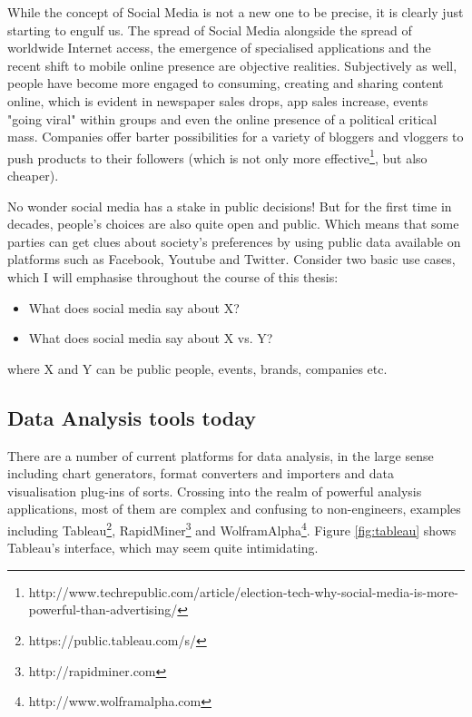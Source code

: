 While the concept of Social Media is not a new one to be precise, it is clearly just starting to engulf us. The spread of Social Media alongside the spread of worldwide Internet access, the emergence of specialised applications and the recent shift to mobile online presence are objective realities. Subjectively as well, people have become more engaged to consuming, creating and sharing content online, which is evident in newspaper sales drops, app sales increase, events "going viral" within groups and even the online presence of a political critical mass. Companies offer barter possibilities for a variety of bloggers and vloggers to push products to their followers (which is not only more effective\footnote{http://www.techrepublic.com/article/election-tech-why-social-media-is-more-powerful-than-advertising/}, but also cheaper).

No wonder social media has a stake in public decisions! But for the first time in decades, people's choices are also quite open and public. Which means that some parties can get clues about society's preferences by using public data available on platforms such as Facebook, Youtube and Twitter. Consider two basic use cases, which I will emphasise throughout the course of this thesis:

\begin{itemize}
\item What does social media say about X?
\item What does social media say about X vs. Y?
\end{itemize}

where X and Y can be public people, events, brands, companies etc. 

\subsection{Data Analysis tools today}
There are a number of current platforms for data analysis, in the large sense including chart generators, format converters and importers and data visualisation plug-ins of sorts. Crossing into the realm of powerful analysis applications, most of them are complex and confusing to non-engineers, examples including Tableau\footnote{https://public.tableau.com/s/}, RapidMiner\footnote{http://rapidminer.com} and WolframAlpha\footnote{http://www.wolframalpha.com}. Figure \ref{fig:tableau} shows Tableau's interface, which may seem quite intimidating.

